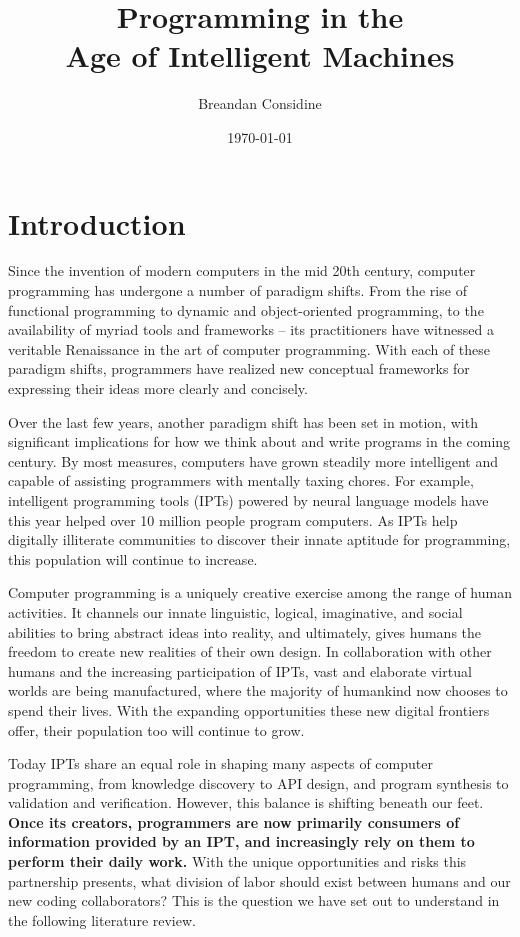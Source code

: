 \documentclass[12pt]{article}
\title{Programming in the \\Age of Intelligent Machines}
\author{Breandan Considine}
\date{\today}
\begin{document}
  \maketitle
  \tableofcontents
  \pagebreak\section{Introduction}

Since the invention of modern computers in the mid 20th century, computer programming has undergone a number of paradigm shifts. From the rise of functional programming to dynamic and object-oriented programming, to the availability of myriad tools and frameworks -- its practitioners have witnessed a veritable Renaissance in the art of computer programming. With each of these paradigm shifts, programmers have realized new conceptual frameworks for expressing their ideas more clearly and concisely.

Over the last few years, another paradigm shift has been set in motion, with significant implications for how we think about and write programs in the coming century. By most measures, computers have grown steadily more intelligent and capable of assisting programmers with mentally taxing chores. For example, intelligent programming tools (IPTs) powered by neural language models have this year helped over 10 million people program computers. As IPTs help digitally illiterate communities to discover their innate aptitude for programming, this population will continue to increase.

Computer programming is a uniquely creative exercise among the range of human activities. It channels our innate linguistic, logical, imaginative, and social abilities to bring abstract ideas into reality, and ultimately, gives humans the freedom to create new realities of their own design. In collaboration with other humans and the increasing participation of IPTs, vast and elaborate virtual worlds are being manufactured, where the majority of humankind now chooses to spend their lives. With the expanding opportunities these new digital frontiers offer, their population too will continue to grow.

Today IPTs share an equal role in shaping many aspects of computer programming, from knowledge discovery to API design, and program synthesis to validation and verification. However, this balance is shifting beneath our feet. \textbf{Once its creators, programmers are now primarily consumers of information provided by an IPT, and increasingly rely on them to perform their daily work.} With the unique opportunities and risks this partnership presents, what division of labor should exist between humans and our new coding collaborators? This is the question we have set out to understand in the following literature review.
\end{document}
